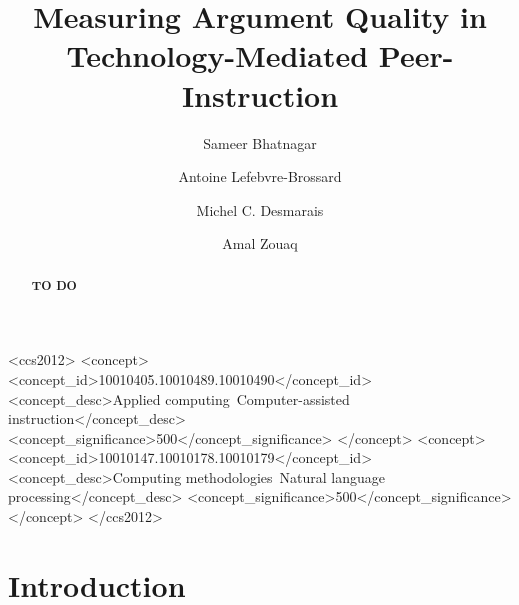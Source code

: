 \documentclass[sigconf]{acmart}
\begin{document}
\title{Measuring Argument Quality in Technology-Mediated 
Peer-Instruction}

\author{Sameer Bhatnagar}
\author{Antoine Lefebvre-Brossard}
\author{Michel C. Desmarais}
\author{Amal Zouaq}


\renewcommand{\shortauthors}{Bhatnagar, et al.}

\begin{abstract}
\textbf{TO DO}
\end{abstract}


\begin{CCSXML}
	<ccs2012>
	<concept>
	<concept_id>10010405.10010489.10010490</concept_id>
	<concept_desc>Applied 
	computing~Computer-assisted 
	instruction</concept_desc>
	<concept_significance>500</concept_significance>
	</concept>
	<concept>
	<concept_id>10010147.10010178.10010179</concept_id>
	<concept_desc>Computing methodologies~Natural 
	language processing</concept_desc>
	<concept_significance>500</concept_significance>
	</concept>
	</ccs2012>
\end{CCSXML}





\maketitle

\section{Introduction}
\end{document}
